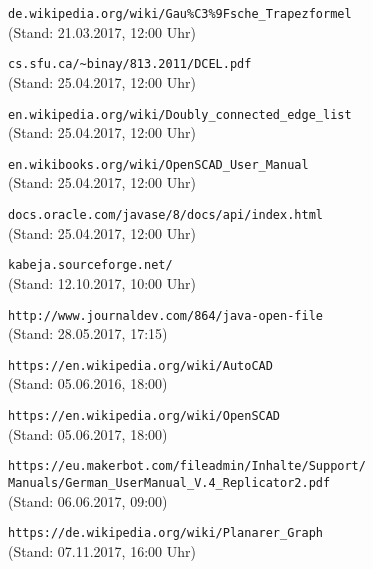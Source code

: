 \begin{thebibliography}{9}
		\verb|de.wikipedia.org/wiki/Gau%C3%9Fsche_Trapezformel| \\ (Stand: 21.03.2017, 12:00 Uhr)
		
		 \verb|cs.sfu.ca/~binay/813.2011/DCEL.pdf| \\ (Stand: 25.04.2017, 12:00 Uhr)

		 \verb|en.wikipedia.org/wiki/Doubly_connected_edge_list| \\ (Stand: 25.04.2017, 12:00 Uhr)
		
		 \verb|en.wikibooks.org/wiki/OpenSCAD_User_Manual| \\ (Stand: 25.04.2017, 12:00 Uhr)
		
		 \verb|docs.oracle.com/javase/8/docs/api/index.html| \\ (Stand: 25.04.2017, 12:00 Uhr)
		
		 \verb|kabeja.sourceforge.net/| \\ (Stand: 12.10.2017, 10:00 Uhr)
		
		 \verb|http://www.journaldev.com/864/java-open-file| \\ (Stand: 28.05.2017, 17:15)
		 
		 \verb|https://en.wikipedia.org/wiki/AutoCAD| \\ (Stand: 05.06.2016, 18:00)
		 
		 \verb|https://en.wikipedia.org/wiki/OpenSCAD| \\ (Stand: 05.06.2017, 18:00)
		 
		\verb|https://eu.makerbot.com/fileadmin/Inhalte/Support/| \\
		\tab \verb|Manuals/German_UserManual_V.4_Replicator2.pdf| \\ (Stand: 06.06.2017, 09:00)
	
		\verb|https://de.wikipedia.org/wiki/Planarer_Graph| \\ (Stand: 07.11.2017, 16:00 Uhr)
	
\end{thebibliography}